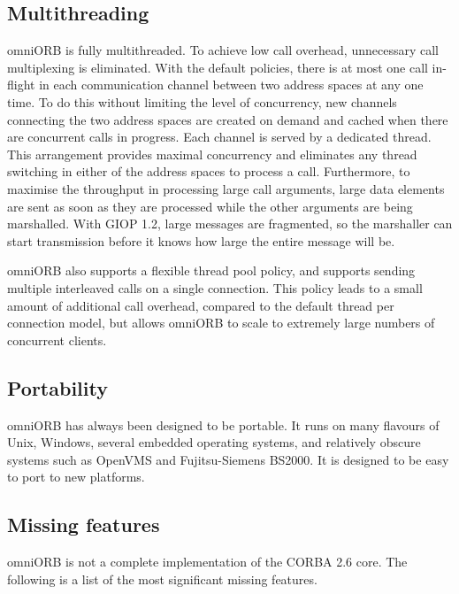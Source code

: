 \documentclass[11pt,oneside,a4paper]{book}
\begin{document}
\subsection{Multithreading}

omniORB is fully multithreaded. To achieve low call overhead,
unnecessary call multiplexing is eliminated. With the default
policies, there is at most one call in-flight in each communication
channel between two address spaces at any one time. To do this without
limiting the level of concurrency, new channels connecting the two
address spaces are created on demand and cached when there are
concurrent calls in progress. Each channel is served by a dedicated
thread. This arrangement provides maximal concurrency and eliminates
any thread switching in either of the address spaces to process a
call. Furthermore, to maximise the throughput in processing large call
arguments, large data elements are sent as soon as they are processed
while the other arguments are being marshalled. With GIOP 1.2, large
messages are fragmented, so the marshaller can start transmission
before it knows how large the entire message will be.

omniORB also supports a flexible thread pool policy, and supports
sending multiple interleaved calls on a single connection. This policy
leads to a small amount of additional call overhead, compared to the
default thread per connection model, but allows omniORB to scale to
extremely large numbers of concurrent clients.


\subsection{Portability}

omniORB has always been designed to be portable. It runs on many
flavours of Unix, Windows, several embedded operating systems, and
relatively obscure systems such as OpenVMS and Fujitsu-Siemens BS2000.
It is designed to be easy to port to new platforms.

\subsection{Missing features}
\label{sec:missing}

omniORB is not a complete implementation of the CORBA 2.6 core.
The following is a list of the most significant missing features.
\end{document}
